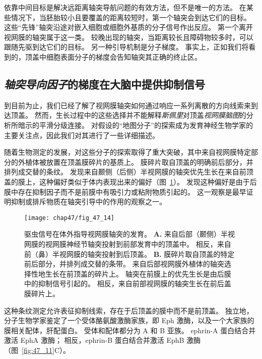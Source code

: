 依靠中间目标是解决远距离轴突导航问题的有效方法，但不是唯一的方法。
在某些情况下，当胚胎较小且要覆盖的距离较短时，第一个轴突会到达它们的目标。
这些“先锋”轴突沿途对嵌入细胞或细胞外基质的分子信号作出反应。
第一个离开视网膜的轴突属于这一类。
较晚出现的轴突，当距离较长且障碍物较多时，可以跟随先驱到达它们的目标。
另一种引导机制是分子梯度。
事实上，正如我们将看到的，顶盖中细胞表面分子的梯度会告知轴突其正确的终止区。



\subsection{\textit{轴突导向因子}的梯度在大脑中提供抑制信号}

到目前为止，我们已经了解了视网膜轴突如何通过响应一系列离散的方向线索来到达顶盖。
然而，生长过程中的这些选择并不能解释\textit{斯佩里}对顶盖\textit{视网膜脑图}的分析所暗示的平滑分级连接。
对假设的“地图分子”的探索成为发育神经生物学家的主要关注点，因此我们对其进行了一些详细描述。


随着生物测定的发展，对这些分子的探索取得了重大突破，其中来自视网膜特定部分的外植体被放置在顶盖膜碎片的基质上。
膜碎片取自顶盖的明确前后部分，并排列成交替的条纹。 
发现来自颞侧（后侧）半视网膜的轴突优先生长在来自前顶盖的膜上，这种偏好类似于体内表现出来的偏好（图~\ref{fig:47_14}）。
发现这种偏好是由于后膜中存在抑制因子而不是前膜中有吸引力或粘附物质引起的。
这一观察是最早证明抑制或排斥物质在轴突引导中的作用的观察之一。


\begin{figure}[htbp]
	\centering
	\texttt{[image: chap47/fig\_47\_14]}
	\caption{驱虫信号在体外指导视网膜轴突的发育。
		\textbf{A.} 来自后部（颞侧）半视网膜的视网膜神经节轴突投射到前部发育中的顶盖中。
		相反，来自前（鼻）半视网膜的轴突投射到后顶盖。
		\textbf{B.} 膜碎片取自顶盖的特定前后部分，并排列成交替的条带。
		来自后部视网膜外植体的轴突选择性地生长在前顶盖的碎片上。
		轴突在前膜上的优先生长是由后膜中的抑制信号引起的。
		相反，来自前部视网膜的轴突生长在前后盖膜碎片上\cite{walter1987avoidance}。}
	\label{fig:47_14}
\end{figure}


这种条纹测定允许表征抑制线索，存在于后顶盖的膜中而不是前顶盖。
独立地，分子生物学家鉴定了一个受体酪氨酸激酶家族，即 Eph 激酶，以及一个大家族的膜相关配体，肝配蛋白。
受体和配体都分为 A 和 B 亚族。
ephrin-A 蛋白结合并激活 EphA 激酶；
相反，ephrin-B 蛋白结合并激活 EphB 激酶（图~\ref{fig:47_11}C）。


